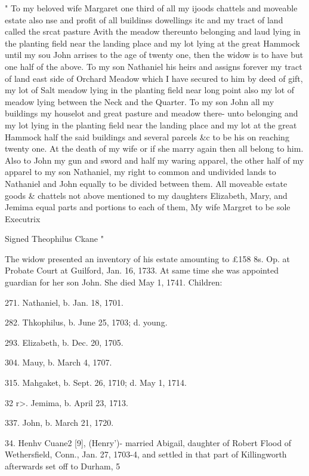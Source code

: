 " To my beloved wife Margaret one third of all my ijoods chattels and 
moveable estate also nse and profit of all buildinss dowellings itc and 
my tract of land called the srcat pasture Avith the meadow thereunto 
belonging and laud lying in the planting field near the landing place and 
my lot lying at the great Hammock until my sou John arrises to the age 
of twenty one, then the widow is to have but one half of the above. 
To my son Nathaniel his heirs and assigns forever my tract of land east 
side of Orchard Meadow which I have secured to him by deed of gift, 
my lot of Salt meadow lying in the planting field near long point also my 
lot of meadow lying between the Neck and the Quarter. To my son 
John all my buildings my houselot and great pasture and meadow there- 
unto belonging and my lot lying in the planting field near the landing 
place and my lot at the great Hammock half the said buildings and 
several parcels \&c to be his on reaching twenty one. At the death of my 
wife or if she marry again then all belong to him. Also to John my gun 
and sword and half my waring apparel, the other half of my apparel to 
my son Nathaniel, my right to common and undivided lands to Nathaniel 
and John equally to be divided between them. All moveable estate 
goods \& chattels not above mentioned to my daughters Elizabeth, Mary, 
and Jemima equal parts and portions to each of them, 
My wife Margret to be sole Executrix 

Signed Theophilus Ckane " 

The widow presented an inventory of his estate amounting to 
£158 8s. Op. at Probate Court at Guilford, Jan. 16, 1733. 
At same time she was appointed guardian for her son John. She 
died May 1, 1741. Children: 

271. Nathaniel, b. Jan. 18, 1701. 

282. Thkophilus, b. June 25, 1703; d. young. 

293. Elizabeth, b. Dec. 20, 1705. 

304. Mauy, b. March 4, 1707. 

315. Mahgaket, b. Sept. 26, 1710; d. May 1, 1714. 

32 r>. Jemima, b. April 23, 1713. 

337. John, b. March 21, 1720. 

34. Henhv Cuane2 [9], (Henry')- married Abigail, daughter 
of Robert Flood of Wethersfield, Conn., Jan. 27, 1703-4, and 
settled in that part of Killingworth afterwards set off to Durham, 
5 




